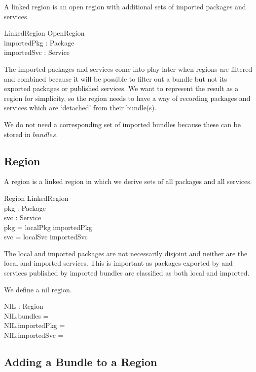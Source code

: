 \documentclass[a4paper,9pt]{article}
\begin{document}
A linked region is an open region with additional sets of imported packages and services.

\begin{schema}{LinkedRegion}
  OpenRegion \\
  importedPkg : \power Package \\
  importedSvc : \power Service \\  
\end{schema}
The imported packages and services come into play later when regions are filtered and combined
because it will be possible to filter out a bundle but not its exported packages or published services.
We want to represent the result as a region for simplicity, so the region needs to have a way
of recording packages and services which are `detached' from their bundle(s).

We do not need a corresponding set of imported bundles because these can be stored in $bundles$.

\subsection{Region}

A region is a linked region in which we derive sets of all packages and all services.
\begin{schema}{Region}
  LinkedRegion \\
  pkg : \power Package \\
  svc : \power Service \\
\where
  pkg = localPkg \cup importedPkg \\
  svc = localSvc \cup importedSvc \\
\end{schema}
The local and imported packages are not necessarily disjoint and neither are the local and imported
services. This is important as packages exported by and services published by imported bundles
are classified as both local and imported.

We define a nil region.
\begin{axdef}
  NIL : Region \\
\where
 NIL.bundles = \emptyset \\
 NIL.importedPkg = \emptyset \\
 NIL.importedSvc = \emptyset \\
 \end{axdef}

\subsection{Adding a Bundle to a Region}
\end{document}
